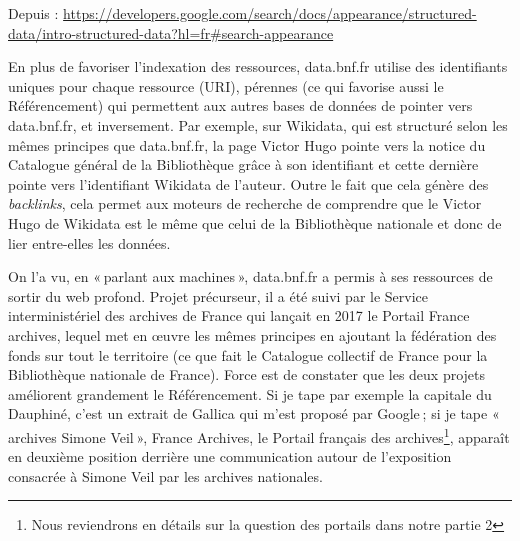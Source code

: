 \begin{center}

Depuis :  \url{https://developers.google.com/search/docs/appearance/structured-data/intro-structured-data?hl=fr#search-appearance}

\end{center}
En plus de favoriser l’indexation des ressources, data.bnf.fr utilise des identifiants uniques pour chaque ressource (URI), pérennes (ce qui favorise aussi le Référencement) qui permettent aux autres bases de données de pointer vers data.bnf.fr, et inversement. Par exemple, sur Wikidata, qui est structuré selon les mêmes principes que data.bnf.fr, la page Victor Hugo pointe vers la notice du Catalogue général de la Bibliothèque grâce à son identifiant et cette dernière pointe vers l’identifiant Wikidata de l’auteur. Outre le fait que cela génère des \textit{backlinks}, cela permet aux moteurs de recherche de comprendre que le Victor Hugo de Wikidata est le même que celui de la Bibliothèque nationale et donc de lier entre-elles les données.

On l’a vu, en « parlant aux machines », data.bnf.fr a permis à ses ressources de sortir du web profond. Projet précurseur, il a été suivi par le Service interministériel des archives de France qui lançait en 2017 le Portail France archives, lequel met en œuvre les mêmes principes en ajoutant la fédération des fonds sur tout le territoire (ce que fait le Catalogue collectif de France pour la Bibliothèque nationale de France). Force est de constater que les deux projets améliorent grandement le Référencement. Si je tape par exemple la capitale du Dauphiné, c’est un extrait de Gallica qui m’est proposé par Google ; si je tape « archives Simone Veil », France Archives, le Portail français des archives\footnote{Nous reviendrons en détails sur la question des portails dans notre partie 2}, apparaît en deuxième position derrière une communication autour de l’exposition consacrée à Simone Veil par les archives nationales.

